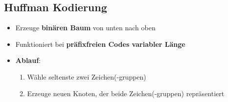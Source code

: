\subsection{Huffman Kodierung}%
\label{bwt:sub:huffman_kodierung}

\begin{itemize}
	\item Erzeuge \textbf{binären Baum} von unten nach oben
	\item Funktioniert bei \textbf{präfixfreien Codes variabler Länge}
	\item \textbf{Ablauf}:
	\begin{enumerate}
		\item Wähle seltenste zwei Zeichen(-gruppen)
		\item Erzeuge neuen Knoten, der beide Zeichen(-gruppen) repräsentiert
	\end{enumerate}
\end{itemize}